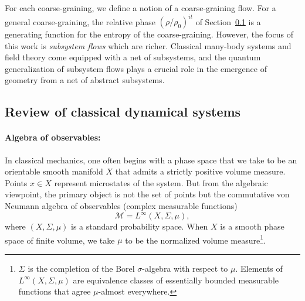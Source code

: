 \documentclass[a4paper,11pt]{article}
\theoremstyle{definition}
\begin{document}
For each coarse-graining, we define a notion of a coarse-graining flow. For a general coarse-graining, the relative phase $(\rho/\rho_0)^{it}$ of Section~\ref{subsec:classical-definitions} is a generating function for the entropy of the coarse-graining. However, the focus of this work is {\it subsystem flows} which are richer.
Classical many-body systems and field theory come equipped with a net of subsystems, and the quantum generalization of subsystem flows plays a crucial role in the emergence of geometry from a net of abstract subsystems.

\subsection{Review of classical dynamical systems}\label{subsec:classical-definitions}

\paragraph{Algebra of observables:} In classical mechanics, one often begins with a phase space that we take to be an orientable smooth manifold \(X\) that admits a strictly positive volume measure. Points \(x\in X\) represent microstates of the system. But from the algebraic viewpoint, the primary object is not the set of points but the commutative von Neumann algebra of observables (complex measurable functions)
\[
\mathcal M=L^\infty(X,\Sigma,\mu),
\]
where \((X,\Sigma,\mu)\) is a standard probability space. When $X$ is a smooth phase space of finite volume, we take $\mu$ to be the normalized volume measure\footnote{$\Sigma$ is the completion of the Borel $\sigma$-algebra with respect to $\mu$. Elements of $L^\infty(X,\Sigma,\mu)$ are equivalence classes of essentially bounded measurable functions that agree $\mu$-almost everywhere.}.
\end{document}
